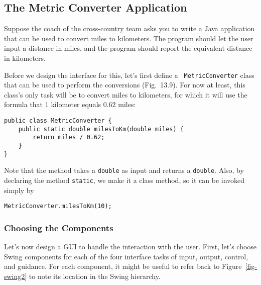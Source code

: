 \subsection{The Metric Converter Application}
\noindent Suppose the coach of the cross-country team asks you to write a Java
application that can be used to convert miles to kilometers.  The
program should let the user input a distance in miles, and the program should
report the equivalent distance in kilometers.

Before we design the interface for this, let's first define a {\tt
Metric\-Converter} class that can be used to perform the
conversions (Fig.~13.9).  For now at least, this class's
only task will be to convert miles to kilometers, for which it will
use the formula that 1 kilometer equals 0.62 miles:

\begin{jjjlisting}
\begin{lstlisting}
public class MetricConverter {
    public static double milesToKm(double miles) {
        return miles / 0.62;
    }
}
\end{lstlisting}
\end{jjjlisting}

\noindent Note that the method takes a {\tt double} as input
and returns a {\tt double}. Also, by declaring the method {\tt static},
we make it a class method, so it can be invoked simply by

\begin{jjjlisting}
\begin{lstlisting}
MetricConverter.milesToKm(10);
\end{lstlisting}
\end{jjjlisting}

\subsubsection*{Choosing the Components}
\noindent Let's now design a GUI to handle the interaction with the user.
First, let's choose Swing components for each of the four interface
tasks of input, output, control, and guidance.  For each component, it
might be useful to refer back to Figure~\ref{fig-swing2} to note its
location in the Swing hierarchy.

